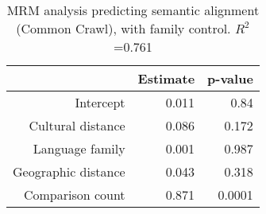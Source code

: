 \begin{table}[ht]
\centering
\begin{tabular}{rrr}
  \hline
 & Estimate & p-value \\ 
  \hline
Intercept & 0.011 & 0.84 \\ 
  Cultural distance & 0.086 & 0.172 \\ 
  Language family & 0.001 & 0.987 \\ 
  Geographic distance & 0.043 & 0.318 \\ 
  Comparison count & 0.871 & 0.0001 \\ 
   \hline
\end{tabular}
\caption{MRM analysis predicting semantic alignment (Common Crawl), with family control. $R^2$=0.761} 
\end{table}
